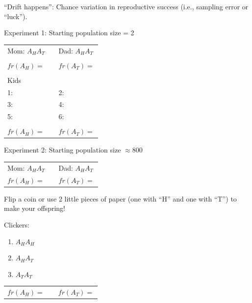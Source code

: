 \begin{frame}[t]
    ``Drift happens'': Chance variation in reproductive success (i.e., sampling
    error or ``luck'').
    
    \vspace{0.5cm}
    Experiment 1: Starting population size = 2

    \begin{table}%
        \centering
        \begin{tabular}{ p{2.5cm} p{2cm} p{2.5cm} }
             Mom: $A_{H}A_{T}$ & & Dad: $A_{H}A_{T}$ \\
             & & \\
             $fr(A_{H})=$ & & $fr(A_{T})=$ \\
              & & \\
             Kids & & \\
             1: & & 2: \\
             3: & & 4: \\
             5: & & 6: \\
             & & \\
             $fr(A_{H})=$ & & $fr(A_{T})=$ \\
        \end{tabular}
    \end{table}
\end{frame}

\begin{frame}
    Experiment 2: Starting population size $\approx 800$

    \begin{table}%
        \centering
        \begin{tabular}{ p{2.5cm} p{2cm} p{2.5cm} }
             Mom: $A_{H}A_{T}$ & & Dad: $A_{H}A_{T}$ \\
             $fr(A_{H})=$ & & $fr(A_{T})=$ \\
        \end{tabular}
    \end{table}

    Flip a coin or use 2 little pieces of paper (one with ``H'' and one with
    ``T'') to make your offspring!

    \vspace{0.5cm}
    Clickers:
    \begin{enumerate}
        \item $A_{H}A_{H}$
        \item $A_{H}A_{T}$
        \item $A_{T}A_{T}$
    \end{enumerate}

    \begin{table}%
        \centering
        \begin{tabular}{ p{2.5cm} p{2cm} p{2.5cm} }
             $fr(A_{H})=$ & & $fr(A_{T})=$ \\
        \end{tabular}
    \end{table}

\end{frame}

